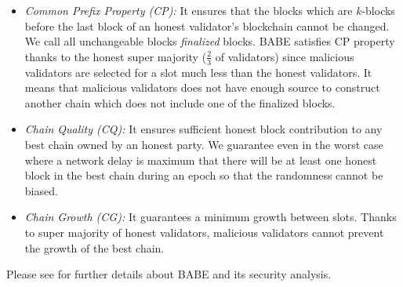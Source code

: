\begin{itemize}
	\item \emph{Common Prefix Property (CP):} It ensures that the blocks which are $ k $-blocks before the last block of an honest validator's blockchain cannot be changed. We call  all unchangeable blocks  \emph{finalized} blocks. BABE satisfies CP property thanks to the honest super majority ($ \frac{2}{3}
	 $ of validators) since malicious validators are selected for a slot much less than the honest validators. It means that malicious validators does not have enough source to construct another chain which does not include one of the finalized blocks.
	\item \emph{Chain Quality (CQ):} It ensures sufficient honest block contribution to any best chain owned by an honest party.	We guarantee even in the worst case where a network delay is maximum that there will be at least one honest block in the best chain during an epoch so that the randomness cannot be biased.
	\item \emph{Chain Growth (CG):} It guarantees a minimum growth between slots. Thanks to super majority of honest validators, malicious validators cannot prevent the growth of the best chain.	
\end{itemize}


Please see \cite{babe} for further details about BABE and  its security analysis.